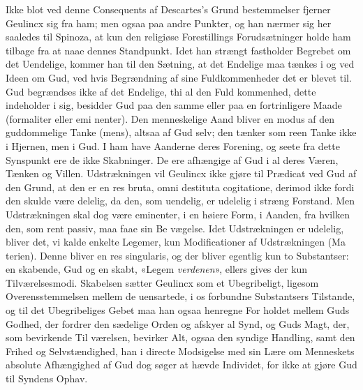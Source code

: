 \documentclass[12pt,a4paper]{book}
\begin{document}
Ikke blot ved denne Consequents af Descartes's Grund\-%
bestemmelser fjerner Geulincx sig fra ham; men ogsaa paa
andre Punkter, og han nærmer sig her saaledes til Spinoza,
at kun den religiøse Forestillings Forudsætninger holde ham
tilbage fra at naae dennes Standpunkt. Idet han strængt
fastholder Begrebet om det Uendelige, kommer han til den
Sætning, at det Endelige maa tænkes i og ved Ideen om Gud,
ved hvis Begrændning af sine Fuldkommenheder det er blevet
til. Gud begrændses ikke af det Endelige, thi al den Fuld\-%
kommenhed, dette indeholder i sig, besidder Gud paa den
samme eller paa en fortrinligere Maade (formaliter eller emi\-%
nenter). Den menneskelige Aand bliver en modus af den
guddommelige Tanke (mens), altsaa af Gud selv; den tænker
som reen Tanke ikke i Hjernen, men i Gud. I ham have
Aanderne deres Forening, og seete fra dette Synspunkt ere de
ikke Skabninger. De ere afhængige af Gud i al deres Væren,
Tænken og Villen. Udstrækningen vil Geulincx ikke gjøre til
Prædicat ved Gud af den Grund, at den er en res bruta,
omni destituta cogitatione, derimod ikke fordi den skulde være
delelig, da den, som uendelig, er udelelig i stræng Forstand.
Men Udstrækningen skal dog være eminenter, i en høiere Form,
i Aanden, fra hvilken den, som rent passiv, maa faae sin Be\-%
vægelse. Idet Udstrækningen er udelelig, bliver det, vi kalde
enkelte Legemer, kun Modificationer af Udstrækningen (Ma\-%
terien). Denne bliver en res singularis, og der bliver egentlig
kun to Substantser: en skabende, Gud og en skabt, «Legem\-%
\emph{verdenen}», ellers gives der kun Tilværelsesmodi. Skabelsen
sætter Geulincx som et Ubegribeligt, ligesom Overensstemmelsen
mellem de uensartede, i os forbundne Substantsers Tilstande,
og til det Ubegribeliges Gebet maa han ogsaa henregne For\-%
holdet mellem Guds Godhed, der fordrer den sædelige Orden
og afskyer al Synd, og Guds Magt, der, som bevirkende Til\-%
værelsen, bevirker Alt, ogsaa den syndige Handling, samt den
Frihed og Selvstændighed, han i directe Modsigelse med sin
Lære om Menneskets absolute Afhængighed af Gud dog søger
at hævde Individet, for ikke at gjøre Gud til Syndens Ophav.
\end{document}
